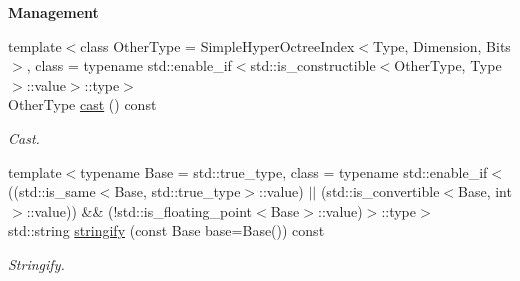 \begin{Indent}{\bf Management}
\begin{DoxyCompactItemize}
{\footnotesize template$<$class Other\-Type  = Simple\-Hyper\-Octree\-Index$<$\-Type, Dimension, Bits$>$, class  = typename std\-::enable\-\_\-if$<$std\-::is\-\_\-constructible$<$\-Other\-Type, Type$>$\-::value$>$\-::type$>$ }\\Other\-Type \hyperlink{exceptionmagrathea_1_1SimpleHyperOctreeIndex_ab1ebd246e330787a2f506b8439c1a5dd}{cast} () const 
\begin{DoxyCompactList}\small\item\em Cast. \end{DoxyCompactList}\item 
{\footnotesize template$<$typename Base  = std\-::true\-\_\-type, class  = typename std\-::enable\-\_\-if$<$((std\-::is\-\_\-same$<$\-Base, std\-::true\-\_\-type$>$\-::value) $|$$|$ (std\-::is\-\_\-convertible$<$\-Base, int$>$\-::value)) \&\& (!std\-::is\-\_\-floating\-\_\-point$<$\-Base$>$\-::value)$>$\-::type$>$ }\\std\-::string \hyperlink{exceptionmagrathea_1_1SimpleHyperOctreeIndex_ac31fa5679ac77664c410182a3eb6aeff}{stringify} (const Base base=Base()) const 
\begin{DoxyCompactList}\small\item\em Stringify. \end{DoxyCompactList}\end{DoxyCompactItemize}
\end{Indent}

